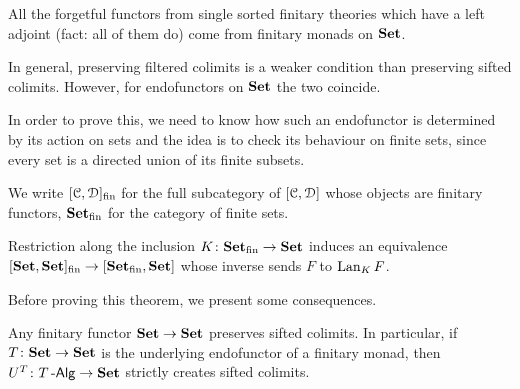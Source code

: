 \documentclass[a4paper,11pt,oneside,openany]{scrbook}
\begin{document}
\begin{exmp}
	All the forgetful functors from single sorted finitary theories which have a left adjoint (fact: all of them do) come from finitary monads on ${\normalfont\textbf{Set}}$.
\end{exmp}

In general, preserving filtered colimits is a weaker condition than preserving sifted colimits. However, for endofunctors on ${\normalfont\textbf{Set}}$ the two coincide.

In order to prove this, we need to know how such an endofunctor is determined by its action on sets and the idea is to check its behaviour on finite sets, since every set is a directed union of its finite subsets.

We write $[\operatorname{\mathcal{C}},\operatorname{\mathcal{D}}]_\text{fin}$ for the full subcategory of $[\operatorname{\mathcal{C}},\operatorname{\mathcal{D}}]$ whose objects are finitary functors, ${\normalfont\textbf{Set}}_\text{fin}$ for the category of finite sets.

\begin{thm}
	Restriction along the inclusion $K\colon{\normalfont\textbf{Set}}_\text{fin}\rightarrow{\normalfont\textbf{Set}}$
	induces an equivalence
	$[{\normalfont\textbf{Set}},{\normalfont\textbf{Set}}]_\text{fin}\rightarrow[{\normalfont\textbf{Set}}_\text{fin},{\normalfont\textbf{Set}}]$ whose inverse
	sends $F$ to $\operatorname{Lan}_KF$.
\end{thm}

Before proving this theorem, we present some consequences.

\begin{cor}
	Any finitary functor ${\normalfont\textbf{Set}}\rightarrow{\normalfont\textbf{Set}}$ preserves sifted colimits. In
    particular, if $T\colon{\normalfont\textbf{Set}}\rightarrow{\normalfont\textbf{Set}}$ is the underlying endofunctor of
    a finitary monad, then $U^T\colon T\operatorname{-\mathsf{Alg}}\rightarrow{\normalfont\textbf{Set}}$ strictly creates
    sifted colimits.
\end{cor}
\end{document}
